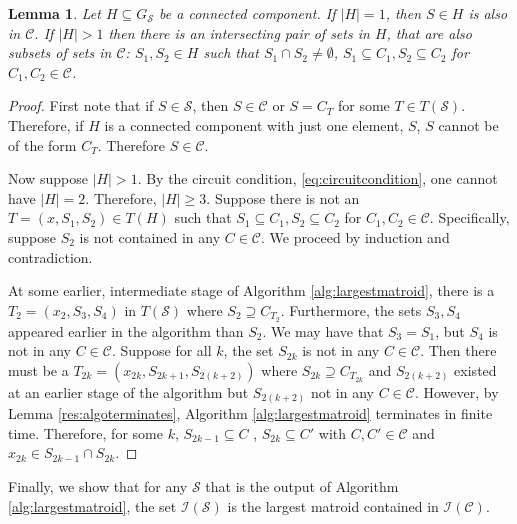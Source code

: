 \documentclass[11pt]{article}
\newcommand{\sI}{\mathscr{I}}
\newcommand{\sC}{\mathscr{C}}
\newcommand{\sS}{\mathscr{S}}
\newtheorem{lem}[thm]{Lemma}
\theoremstyle{remark}
\theoremstyle{definition}
\begin{document}
\begin{lem} \label{res:orginaledgesubsetineachcc}
    Let $H \subseteq G_\sS$ be a connected component. If $|H| = 1$, then $S \in H$ is also in $\sC$. If $|H| >1$ then there is an intersecting pair of sets in $H$, that are also subsets of sets in $\sC$: $S_1, S_2 \in H$ such that $S_1 \cap S_2 \neq \emptyset$, $S_1 \subseteq C_1, S_2\subseteq C_2$ for $C_1, C_2\in \sC$.
\end{lem}
\begin{proof}
    First note that if $S \in \sS$, then $S \in \sC$ or $S = C_T$ for some $T \in T(\sS)$. Therefore, if $H$ is a connected component with just one element, $S$, $S$ cannot be of the form $C_T$. Therefore $S \in \sC$.

    Now suppose $|H| >1$. By the circuit condition, \eqref{eq:circuitcondition}, one cannot have $|H| = 2$. Therefore,  $|H| \geq 3$. Suppose there is not an $T = (x, S_1, S_2) \in T(H)$ such that $S_1 \subseteq C_1, S_2\subseteq C_2$ for $C_1, C_2\in \sC$. Specifically, suppose $S_2$ is not contained in any $C \in \sC$. We proceed by induction and contradiction. 
    
    At some earlier, intermediate stage of Algorithm \ref{alg:largestmatroid}, there is a $T_2 = (x_2, S_3, S_4)$ in $T(\sS)$ where $S_2  \supseteq C_{T_2}$. Furthermore, the sets $S_3, S_4$ appeared earlier in the algorithm than $S_2$. We may have that $S_3 = S_1$, but $S_4$ is  not in any $C \in \sC$. Suppose for all $k$, the set $S_{2k}$ is not in any $C \in \sC$. Then there must be a $T_{2k} = (x_{2k}, S_{2k+1}, S_{2(k+2)})$ where $S_{2k} \supseteq C_{T_{2k}}$ and $S_{2(k+2)}$ existed at an earlier stage of the algorithm but $S_{2(k+2)}$ not in any $C \in \sC$. However, by Lemma \ref{res:algoterminates}, Algorithm \ref{alg:largestmatroid} terminates in finite time. Therefore, for some $k$, $S_{2k-1} \subseteq C$ , $S_{2k} \subseteq C'$ with  $C, C'\in \sC$ and $x_{2k} \in S_{2k-1} \cap S_{2k} $. 

\end{proof}

Finally, we show that for any $\sS$ that is the output of Algorithm \ref{alg:largestmatroid}, the set $\sI(\sS)$ is the largest matroid contained in $\sI(\sC)$.  
\end{document}
